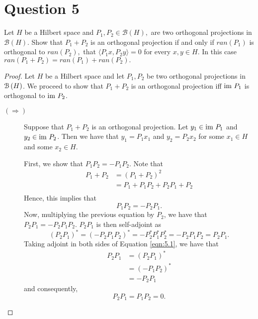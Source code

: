 \section{Question 5}

\horz

Let $H$ be a Hilbert space and $P_1, P_2\in \mathcal B(H),$ are two orthogonal projections in $\mathcal B(H).$  Show that $P_1 +P_2$ is an orthogonal projection if and only if $ran(P_1)$ is orthogonal to $ran(P_2),$ that $\langle P_1x, P_2y\rangle =0$ for every $x,y\in H.$ In this case $ran (P_1+P_2)= ran(P_1) + ran (P_2).$

\horz

\begin{proof}
    Let $H$ be a Hilbert space and let $P_{1}, P_{2}$ be two orthogonal projections in ${\cal B} \left( H \right)$. We proceed to show that $P_{1} + P_{2}$ is an orthogonal projection iff ${\text{im }} P_{1}$ is orthogonal to ${\text{im }} P_{2}$. 

    \begin{description}
	\item[$\left( \Longrightarrow \right)$] Suppose that $P_{1} + P_{2}$ is an orthogonal projection. Let $y_{1} \in {\text{im }} P_{1}$ and $y_{2} \in {\text{im }} P_{2}$. Then we have that $y_{1} = P_{1}x_{1}$ and $y_{2} =P_{2}x_{2}$ for some $x_{1} \in H$ and some $x_{2} \in H$.

	    First, we show that $P_{1} P_{2} = -P_{1} P_{2}$. Note that
	    \begin{align*}
		P_{1} + P_{2} &=  \left( P_{1} + P_{2} \right)^{2} \\
		&= P_{1} + P_{1}P_{2} + P_{2} P_{1} + P_{2} \\
	    \end{align*}
	    Hence, this implies that
	    \begin{equation}
		P_{1}P_{2}=-P_{2}P_{1}.
		\label{eqn:5.1}
	    \end{equation}
	    Now, multiplying the previous equation by $P_{2}$, we have that $P_{2}P_{1}=-P_{2}P_{1}P_{2}$. $P_{2}P_{1}$ is then self-adjoint as
	    \begin{equation*}
		(P_{2}P_{1})^{*} = \left( -P_{2}P_{1}P_{2} \right)^{*} = - P_{2}^{*} P_{1}^{*} P_{2}^{*} = -P_{2} P_{1} P_{2}=P_{2}P_{1}.
	    \end{equation*}
	    Taking adjoint in both sides of Equation \ref{eqn:5.1}, we have that 
	    \begin{align*}
		P_{2}P_{1}&=\left( P_{2}P_{1} \right)^{*} \\
		&= \left( -P_{1}P_{2} \right)^{*} \\
		&= -P_{2}P_{1}
	    \end{align*}
	    and consequently,
	    \begin{equation}
		P_{2}P_{1} = P_{1}P_{2} = 0.
		\label{eqn:5.2}
	    \end{equation}


\end{description}
\end{proof}
